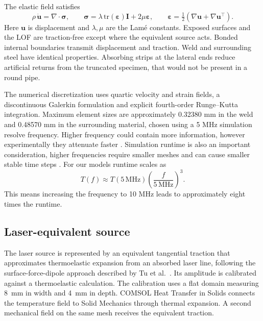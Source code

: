 The elastic field satisfies
\begin{equation}
 \rho\,\ddot{\mathbf u}=\nabla\!\cdot\boldsymbol\sigma,
 \qquad \boldsymbol\sigma=\lambda\,\mathrm{tr}(\boldsymbol\varepsilon)\mathbf I
                 +2\mu\boldsymbol\varepsilon,
 \qquad \boldsymbol\varepsilon=\tfrac12(\nabla\mathbf u+\nabla\mathbf u^{\top}).
\end{equation}
Here $\mathbf u$ is displacement and $\lambda,\mu$ are the Lam\'e constants. Exposed surfaces and the LOF are traction-free except where the equivalent source acts. Bonded internal boundaries transmit displacement and traction. Weld and surrounding steel have identical properties. Absorbing strips at the lateral ends reduce artificial returns from the truncated specimen, that would not be present in a round pipe.

The numerical discretization uses quartic velocity and strain fields, a discontinuous Galerkin formulation and explicit fourth-order Runge--Kutta integration. Maximum element sizes are approximately 0.32380 mm in the weld and 0.48570 mm in the surrounding material, chosen using a 5 MHz simulation resolve frequency. Higher frequency could contain more information, however experimentally they attenuate faster \cite{wan-2017}. Simulation runtime is also an important consideration, higher frequencies require smaller meshes and can cause smaller stable time steps \cite{comsol-elastic-mesh}. For our models runtime scales as \begin{equation}
    T(f) \approx T(5\,\mathrm{MHz})
    \left(\frac{f}{5\,\mathrm{MHz}}\right)^3.
    \label{eq:runtime_frequency_scaling}
\end{equation}
This means increasing the frequency to 10 MHz leads to approximately eight times the runtime.

\subsection{Laser-equivalent source}
\label{combinedex:calibration}
The laser source is represented by an equivalent tangential traction that approximates thermoelastic expansion from an absorbed laser line, following the surface-force-dipole approach described by Tu et al.~\cite{tu}. Its amplitude is calibrated against a thermoelastic calculation. The calibration uses a flat domain measuring 8~mm in width and 4~mm in depth. COMSOL Heat Transfer in Solids connects the temperature field to Solid Mechanics through thermal expansion. A second mechanical field on the same mesh receives the equivalent traction.

